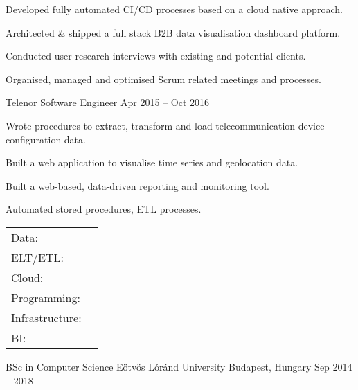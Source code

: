 \documentclass[]{awesome-cv}
\begin{document}
\begin{cventries}
{\begin{cvitems}
		\item {Developed fully automated CI/CD processes based on a cloud native approach.}
		\item {Architected \& shipped a full stack B2B data visualisation dashboard platform.}
		\item {Conducted user research interviews with existing and potential clients.}
		\item {Organised, managed and optimised Scrum related meetings and processes.}
		\end{cvitems}}
	\cventry
	{Telenor}
	{Software Engineer}
	{Apr 2015 – Oct 2016}
	{}
	{\begin{cvitems}
		\item {Wrote procedures to extract, transform and load telecommunication device configuration data.}
		\item {Built a web application to visualise time series and geolocation data.}
		\item {Built a web-based, data-driven reporting and monitoring tool.}
		\item {Automated stored procedures, ETL processes.}
		\end{cvitems}}
\end{cventries}
\begin{cventries}
	\cventry
	{}
	{\def\arraystretch{1.15}{\begin{tabular}{ l l }
		Data: & {\skill{ Snowflake, BigQuery, Databricks, Materialize}} \\
		ELT/ETL: & {\skill{ dbt, Airflow, Kafka,  Redpanda, Fivetran, Meltano, Debezium, CDC }} \\ 
		Cloud:  & {\skill{ Composer, GKE, Cloud Functions, Cloud Build, Pub/Sub, GCS, etc. }} \\
		Programming:  & {\skill{ Python (pandas, luigi, scikit, FastAPI, etc.), SQL, bash, Go, HTML/JS/CSS3 }} \\
		Infrastructure:  & {\skill{ Terraform, Docker, Kubernetes, CI/CD, Google Cloud Platform, GNU/Linux }} \\
		BI: & {\skill{ Looker, Data Studio, Streamlit }} \\
		\end{tabular}}}
	{}
	{}
	{}
\end{cventries}

\begin{cventries}
	\cventry
	{BSc in Computer Science}
	{Eötvös Lóránd University}
	{Budapest, Hungary}
	{Sep 2014 – 2018}
	{}
\end{cventries}

\vspace{-2mm}
\ 
\end{document}
